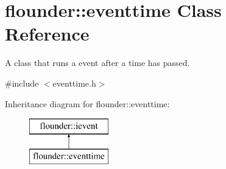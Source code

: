 \hypertarget{classflounder_1_1eventtime}{}\section{flounder\+:\+:eventtime Class Reference}
\label{classflounder_1_1eventtime}


A class that runs a event after a time has passed.  




{\ttfamily \#include $<$eventtime.\+h$>$}

Inheritance diagram for flounder\+:\+:eventtime\+:\begin{figure}[H]
\begin{center}
\leavevmode
\includegraphics[height=2.000000cm]{classflounder_1_1eventtime}
\end{center}
\end{figure}
